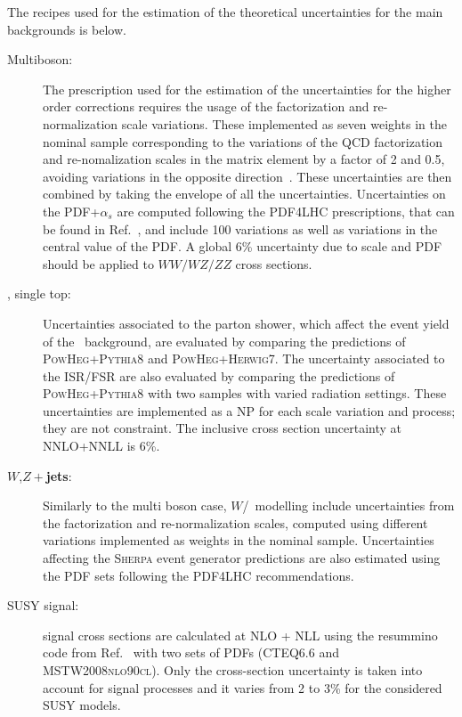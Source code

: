 	The recipes used for the estimation of the theoretical uncertainties for the main backgrounds is below. 
	\begin{description}
	\item[Multiboson:] The prescription used for the estimation of the uncertainties for the higher order corrections requires the usage of the factorization and re-normalization scale variations. These implemented as seven weights in the nominal sample corresponding to the variations of the \ac{QCD} factorization and re-nomalization scales in the matrix element by a factor of 2 and 0.5,  avoiding variations in the opposite direction~\cite{QCDvar}. These uncertainties are then combined by taking the envelope of all the uncertainties. 
	Uncertainties on the \ac{PDF}+$\alpha_s$ are computed following the \textsc{PDF4LHC} prescriptions, that can be found in Ref.~\cite{PDF4LHC}, and include 100 variations as well as variations in the central value of the \ac{PDF}. A global 6\% uncertainty due to scale and \ac{PDF} should be applied to $WW/WZ/ZZ$ cross sections. 
	
	\item[\boldmath \ttbar, single top:] Uncertainties associated to the parton shower, which affect the event yield of the \ttbar\ background, are evaluated by comparing the predictions of \textsc{PowHeg+Pythia8} and \textsc{PowHeg+Herwig7}. The uncertainty associated to the \ac{ISR}/\ac{FSR} are also evaluated by comparing the predictions of \textsc{PowHeg+Pythia8} with two samples with varied radiation settings. These uncertainties are implemented as a \ac{NP} for each scale variation and process; they are not constraint.
	The inclusive cross section uncertainty at \ac{NNLO+NNLL} is 6\%.
	
	\item[\boldmath $W$,\boldmath$Z+$\textbf{jets}:] Similarly to the multi boson case, $W$/\Zjets\ modelling include uncertainties from the factorization and re-normalization scales, computed using different variations implemented as weights in the nominal sample. Uncertainties affecting the \textsc{Sherpa} event generator predictions are also estimated using the \ac{PDF} sets following the \textsc{PDF4LHC} recommendations.
	
	\item[SUSY signal:] signal cross sections are calculated at \ac{NLO + NLL} using the resummino code from Ref.~\cite{cite-1} with two sets of \acp{PDF} (\textsc{CTEQ6.6} and \textsc{MSTW2008nlo90cl}). Only the cross-section uncertainty is taken into account for signal processes and it varies from 2 to 3\% for the considered \ac{SUSY} models. 
	

\end{description}
